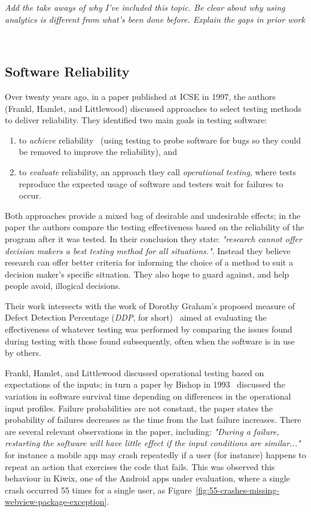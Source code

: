 \emph{Add the take aways of why I've included this topic. Be clear about why using analytics is different from what's been done before. Explain the gaps in prior work}

~\hypertarget{software.reliability}{}
\subsection{Software Reliability}
Over twenty years ago, in a paper published at ICSE in 1997, the authors (Frankl, Hamlet, and Littlewood) discussed approaches to select testing methods to deliver reliability. They identified two main goals in testing software: 
\begin{enumerate}
    \item to \emph{achieve} reliability~\cite{frankl1997choosing_testing_for_reliability} (using testing to probe software for bugs so they could be removed to improve the reliability), and 
    \item to \emph{evaluate} reliability, an approach they call \emph{operational testing}, where tests reproduce the expected usage of software and testers wait for failures to occur.
\end{enumerate}

Both approaches provide a mixed bag of desirable and undesirable effects; in the paper the authors compare the testing effectiveness based on the reliability of the program after it was tested. In their conclusion they state: \emph{"research cannot offer decision makers a best testing method for all situations."}. Instead they believe research can offer better criteria for informing the choice of a method to suit a decision maker's specific situation. They also hope to guard against, and help people avoid, illogical decisions.

Their work intersects with the work of Dorothy Graham's proposed measure of Defect Detection Percentage (\emph{DDP}, for short)~\cite{graham_measuring_2009} aimed at evaluating the effectiveness of whatever testing was performed by comparing the issues found during testing with those found subsequently, often when the software is in use by others.

Frankl, Hamlet, and Littlewood discussed operational testing based on expectations of the inputs; in turn a paper by Bishop in 1993~\cite{bishop1993variation} discussed the variation in software survival time depending on differences in the operational input profiles. Failure probabilities are not constant, the paper states the probability of failures decreases as the time from the last failure increases. There are several relevant observations in the paper, including: \emph{"During a failure, restarting the software will have little effect if the input conditions are similar..."} for instance a mobile app may crash repeatedly if a user (for instance) happens to repeat an action that exercises the code that fails. This was observed this behaviour in Kiwix, one of the Android apps under evaluation, where a single crash occurred 55 times for a single user, as Figure~\ref{fig:55-crashes-missing-webview-package-exception}.

